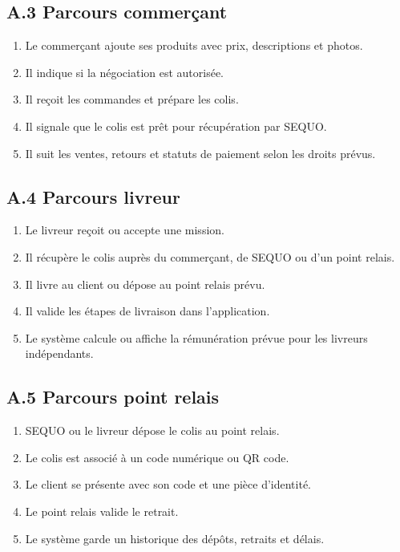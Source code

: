 \documentclass[11pt,a4paper]{article}
\begin{document}
\subsection*{A.3 Parcours commerçant}

\begin{enumerate}
    \item Le commerçant ajoute ses produits avec prix, descriptions et photos.
    \item Il indique si la négociation est autorisée.
    \item Il reçoit les commandes et prépare les colis.
    \item Il signale que le colis est prêt pour récupération par SEQUO.
    \item Il suit les ventes, retours et statuts de paiement selon les droits prévus.
\end{enumerate}

\subsection*{A.4 Parcours livreur}

\begin{enumerate}
    \item Le livreur reçoit ou accepte une mission.
    \item Il récupère le colis auprès du commerçant, de SEQUO ou d'un point relais.
    \item Il livre au client ou dépose au point relais prévu.
    \item Il valide les étapes de livraison dans l'application.
    \item Le système calcule ou affiche la rémunération prévue pour les livreurs indépendants.
\end{enumerate}

\subsection*{A.5 Parcours point relais}

\begin{enumerate}
    \item SEQUO ou le livreur dépose le colis au point relais.
    \item Le colis est associé à un code numérique ou QR code.
    \item Le client se présente avec son code et une pièce d'identité.
    \item Le point relais valide le retrait.
    \item Le système garde un historique des dépôts, retraits et délais.
\end{enumerate}
\end{document}
